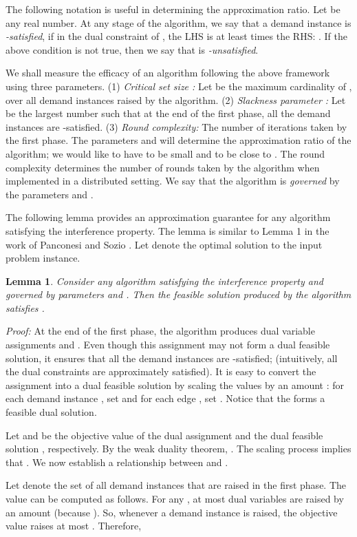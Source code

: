 \documentclass[11pt]{article}
\newtheorem{lemma}[theorem]{\bf Lemma}
\newcommand{\proof} {{\it Proof: }}
\begin{document}
The following notation is useful in determining the approximation ratio.
Let  be any real number.
At any stage of the algorithm, we say that a demand instance  is
{\em -satisfied}, if in the dual constraint of ,
the LHS is at least  times the RHS:
.
If the above condition is not true, then we say that  is {\em -unsatisfied}.

We shall measure the efficacy of an algorithm following the above framework using three parameters.
(1) {\em Critical set size : }Let  be the maximum cardinality of ,
over all demand instances  raised by the algorithm.
(2) {\em Slackness parameter : }Let  be the largest number such that
at the end of the first phase, all the demand instances  are -satisfied.
(3) {\em Round complexity: }The number of iterations taken by the first phase.
The parameters  and  will determine the approximation ratio of the algorithm;
we would like to have  to be small and  to be close to .
The round complexity determines the number of rounds taken by the algorithm when implemented in a distributed setting.
We say that the algorithm is {\em governed} by the parameters  and .

The following lemma provides an approximation guarantee for any algorithm satisfying the interference property.
The lemma is similar to Lemma 1 {in} the work of Panconesi and Sozio \cite{Pancc}. 
Let  denote the optimal solution to the input problem instance.

\begin{lemma}
\label{lem:AAA}
Consider any algorithm satisfying the interference property and governed by parameters  and .
Then the feasible solution  produced by the algorithm satisfies 
.
\end{lemma}
\proof
At the end of the first phase,
the algorithm produces dual variable assignments  and .
Even though this assignment may not form a dual feasible solution,
it ensures that all the demand instances are -satisfied;
(intuitively, all the dual constraints are approximately satisfied).
It is easy to convert the assignment  into a dual feasible solution
by scaling the values by an amount :
for each demand instance , set  and 
for each edge , set .
Notice that the  forms a feasible dual solution.

Let  and  be the objective
value of the dual assignment 
and the dual feasible solution ,
respectively. By the weak duality theorem, .
The scaling process implies that .
We now establish a relationship between  and .

Let  denote the set of all demand instances that are raised in the first phase.
The value  can be computed as follows.
For any , at most  dual variables are raised by an amount  (because ).
So, whenever a demand instance  is raised, the objective value raises at most .
Therefore,
\end{document}
